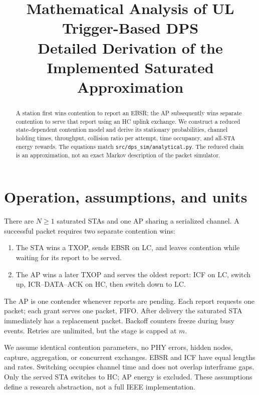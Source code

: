 \documentclass[11pt,a4paper]{article}
\title{Mathematical Analysis of UL Trigger-Based DPS\\
\large Detailed Derivation of the Implemented Saturated Approximation}
\author{}
\date{}
\begin{document}
\maketitle
\begin{abstract}
A station first wins contention to report an EBSR; the AP subsequently wins
separate contention to serve that report using an HC uplink exchange. We
construct a reduced state-dependent contention model and derive its
stationary probabilities, channel holding times, throughput, collision ratio
per attempt, time occupancy, and all-STA energy rewards. The equations match
\texttt{src/dps\_sim/analytical.py}. The reduced chain is an approximation,
not an exact Markov description of the packet simulator.
\end{abstract}
\tableofcontents

\section{Operation, assumptions, and units}
There are $N\geq1$ saturated STAs and one AP sharing a serialized channel.
A successful packet requires two separate contention wins:
\begin{enumerate}
\item The STA wins a TXOP, sends EBSR on LC, and leaves contention while
waiting for its report to be served.
\item The AP wins a later TXOP and serves the oldest report: ICF on LC,
switch up, ICR--DATA--ACK on HC, then switch down to LC.
\end{enumerate}
The AP is one contender whenever reports are pending. Each report requests
one packet; each grant serves one packet, FIFO. After delivery the saturated
STA immediately has a replacement packet. Backoff counters freeze during
busy events. Retries are unlimited, but the stage is capped at $m$.

We assume identical contention parameters, no PHY errors, hidden nodes,
capture, aggregation, or concurrent exchanges. EBSR and ICF have equal
lengths and rates. Switching occupies channel time and does not overlap
interframe gaps. Only the served STA switches to HC; AP energy is excluded.
These assumptions define a research abstraction, not a full IEEE implementation.
\end{document}

